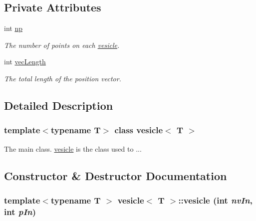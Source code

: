 \subsection*{Private Attributes}
\begin{DoxyCompactItemize}
\item 
\hypertarget{classvesicle_ad52297e96dd4cdfb62d16eb05692f71c}{
int \hyperlink{classvesicle_ad52297e96dd4cdfb62d16eb05692f71c}{np}}
\label{classvesicle_ad52297e96dd4cdfb62d16eb05692f71c}

\begin{DoxyCompactList}\small\item\em The number of points on each \hyperlink{classvesicle}{vesicle}. \item\end{DoxyCompactList}\item 
\hypertarget{classvesicle_abb0d0a00142a4a455efb3119aab56a22}{
int \hyperlink{classvesicle_abb0d0a00142a4a455efb3119aab56a22}{vecLength}}
\label{classvesicle_abb0d0a00142a4a455efb3119aab56a22}

\begin{DoxyCompactList}\small\item\em The total length of the position vector. \item\end{DoxyCompactList}\end{DoxyCompactItemize}


\subsection{Detailed Description}
\subsubsection*{template$<$typename T$>$ class vesicle$<$ T $>$}

The main class. \hyperlink{classvesicle}{vesicle} is the class used to ... 

\subsection{Constructor \& Destructor Documentation}
\hypertarget{classvesicle_ac6b846421ac3c6b5d919ef8e9209fbad}{
\subsubsection[{vesicle}]{\setlength{\rightskip}{0pt plus 5cm}template$<$typename T $>$ {\bf vesicle}$<$ T $>$::{\bf vesicle} (int {\em nvIn}, \/  int {\em pIn})}}
\label{classvesicle_ac6b846421ac3c6b5d919ef8e9209fbad}


